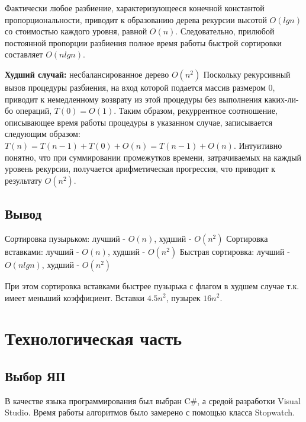 \documentclass[12pt]{report}
\begin{document}
Фактически любое разбиение, характеризующееся конечной константой пропорциональности, приводит к образованию дерева рекурсии высотой $O(lgn)$ со стоимостью каждого уровня, равной $O(n)$. Следовательно, прилюбой постоянной пропорции разбиения полное время работы быстрой сортировки составляет $O(nlgn)$.

\textbf{Худший случай:} несбалансированное дерево $O(n^2)$
Поскольку рекурсивный вызов процедуры разбиения, на вход которой подается массив размером 0, приводит к немедленному возврату из этой процедуры без выполнения каких-ли-бо операций, $T(0) = O(1)$. Таким образом, рекуррентное соотношение, описывающее время работы процедуры в указанном случае, записывается следующим образом: 
$T(n) =T(n-1) +T(0) + O(n) =T(n-1) + O(n)$. Интуитивно понятно, что при суммировании промежутков времени, затрачиваемых на каждый уровень рекурсии, получается арифметическая прогрессия, что приводит к результату $O(n^2)$.

\section{Вывод}
Сортировка пузырьком: лучший - $O(n)$, худший - $O(n^2)$ \newline
Сортировка вставками: лучший - $O(n)$, худший - $O(n^2)$ \newline
Быстрая сортировка: лучший - $O(nlgn)$, худший - $O(n^2)$ \newline

При этом сортировка вставками быстрее пузырька с флагом в худшем случае т.к. имеет меньший коэффициент. Вставки $4.5n^2$, пузырек $16n^2$.


\chapter{Технологическая часть}
\section{Выбор ЯП}
В качестве языка программирования был выбран C\#, а средой разработки Visual Studio.
Время работы алгоритмов было замерено с помощью класса Stopwatch.
\end{document}
